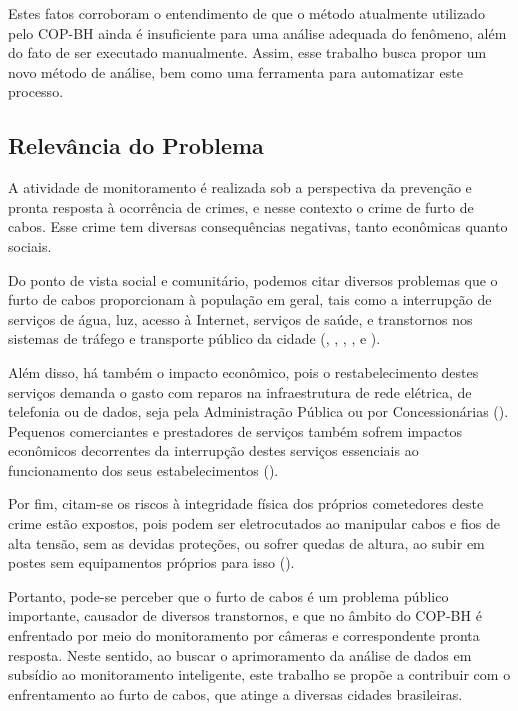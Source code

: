 Estes fatos corroboram o entendimento de que o método atualmente utilizado pelo COP-BH ainda é insuficiente para uma análise adequada do fenômeno, além do fato de ser executado manualmente. Assim, esse trabalho busca propor um novo método de análise, bem como uma ferramenta para automatizar este processo.

\subsection{Relevância do Problema}

A atividade de monitoramento é realizada sob a perspectiva da prevenção e pronta resposta à ocorrência de crimes, e nesse contexto o crime de furto de cabos. Esse crime tem diversas consequências negativas, tanto econômicas quanto sociais.

Do ponto de vista social e comunitário, podemos citar diversos problemas que o furto de cabos proporcionam à população em geral, tais como a interrupção de serviços de água, luz, acesso à Internet, serviços de saúde, e transtornos nos sistemas de tráfego e transporte público da cidade  (, , , ,  e ).  

Além disso, há também o impacto econômico, pois o restabelecimento destes serviços demanda o gasto com reparos na infraestrutura de rede elétrica, de telefonia ou de dados, seja pela Administração Pública ou por Concessionárias (). Pequenos comerciantes e prestadores de serviços também sofrem impactos econômicos decorrentes da interrupção destes serviços essenciais ao funcionamento dos seus estabelecimentos ().

Por fim, citam-se os riscos à integridade física dos próprios cometedores deste crime estão expostos, pois podem ser eletrocutados ao manipular cabos e fios de alta tensão, sem as devidas proteções, ou sofrer quedas de altura, ao subir em postes sem equipamentos próprios para isso (). 

Portanto, pode-se perceber que o furto de cabos é um problema público importante, causador de diversos transtornos, e que no âmbito do COP-BH é enfrentado por meio do monitoramento por câmeras e correspondente pronta resposta. Neste sentido, ao buscar o aprimoramento da análise de dados em subsídio ao monitoramento inteligente, este trabalho se propõe a contribuir com o enfrentamento ao furto de cabos, que atinge a diversas cidades brasileiras.

